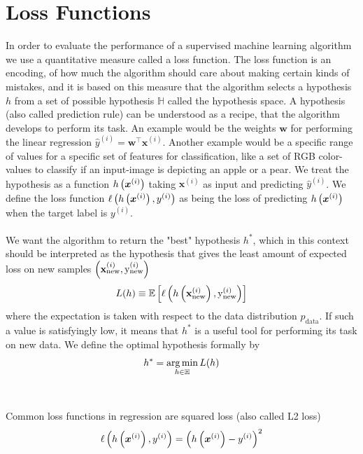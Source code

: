 \section{Loss Functions} \label{sec:loss_func}
In order to evaluate the performance of a supervised machine learning algorithm we use a quantitative measure called a loss function. The loss function is an encoding, of how much the algorithm should care about making certain kinds of mistakes, and it is based on this measure that the algorithm selects a hypothesis $h$ from a set of possible hypothesis $\mathbb{H}$ called the hypothesis space. A hypothesis (also called prediction rule) can be understood as a recipe, that the algorithm develops to perform its task. An example would be the weights $\boldsymbol{w}$ for performing the linear regression $\hat{y}^{(i)} = \boldsymbol{w}^\top \boldsymbol{x}^{(i)}$. Another example would be a specific range of values for a specific set of features for classification, like a set of RGB color-values to classify if an input-image is depicting an apple or a pear. We treat the hypothesis as a function $h\left (\boldsymbol{x}^{(i)}\right)$ taking $\boldsymbol{x}^{(i)}$ as input and predicting $\hat{y}^{(i)}$. We define the loss function $\ell \left (h \left (\boldsymbol{x}^{(i)}\right), y^{(i)}\right)$ as being the loss of predicting $h \left (\boldsymbol{x}^{(i)}\right)$ when the target label is $y^{(i)}$.\\ 
\\
We want the algorithm to return the "best" hypothesis $h^*$, which in this context should be interpreted as the hypothesis that gives the least amount of expected loss on new samples $\left (\mathbf{x}^{(i)}_{\text{new}}, \text{y}^{(i)}_{\text{new}}\right)$
\begin{equation*}
    L(h) \equiv \E \lrs{\ell \lr{h \lr{\mathbf{x}_{\text{new}}^{(i)}}, \text{y}_{\text{new}}^{(i)}}}
\end{equation*}
where the expectation is taken with respect to the data distribution $p_{\text{data}}$. If such a value is satisfyingly low, it means that $h^*$ is a useful tool for performing its task on new data. We define the optimal hypothesis formally by
\begin{equation*}
   h^* = \operatorname*{arg\,min}_{h \in \mathbb{H}} L(h)
\end{equation*}
\\
\\
Common loss functions in regression are squared loss (also called L2 loss)
\begin{equation} \label{eq:mse}
    \ell\left(h\left (\boldsymbol{x}^{(i)}\right), y^{(i)} \right) = \left ( h\left (\boldsymbol{x}^{(i)}\right) - y^{(i)} \right)^2
\end{equation}
